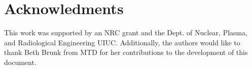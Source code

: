 \documentclass{anstrans}
\begin{document}
\section{Acknowledments}

This work was supported by an NRC grant and the Dept. of Nuclear, Plasma, and Radiological Engineering UIUC.
Additionally, the authors would like to thank Beth Brunk from MTD for her contributions to the development of this document.



\end{document}
